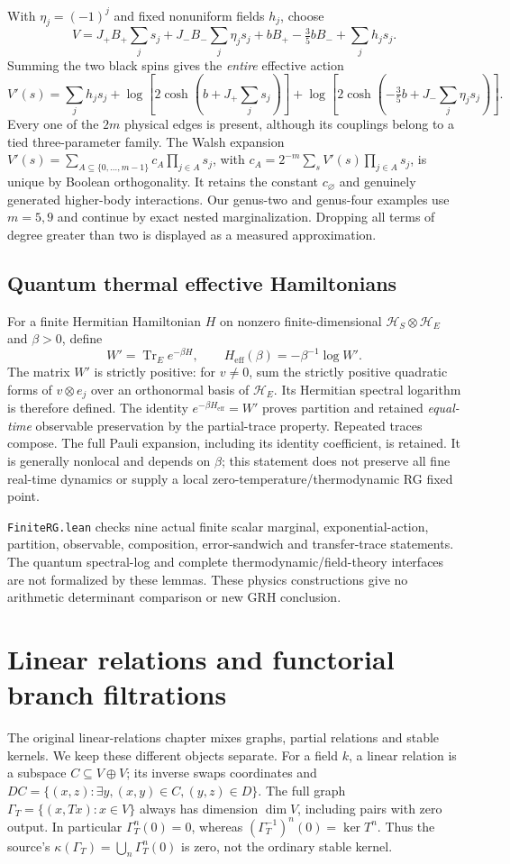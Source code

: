 \documentclass[11pt]{article}
\theoremstyle{definition}\newtheorem{definition}[theorem]{Definition}
\theoremstyle{remark}\newtheorem{remark}[theorem]{Remark}
\begin{document}
With $\eta_j=(-1)^j $ and fixed nonuniform fields $ h_j $, choose
\[
 V=J_+B_+\sum_js_j+J_-B_-\sum_j\eta_js_j
       +bB_+-\tfrac 35 bB_-+\sum_jh_js_j.
\]
Summing the two black spins gives the \emph{entire} effective action
\[
 V'(s)=\sum_jh_js_j+
 \log\!\left[2\cosh\!\left(b+J_+\sum_js_j\right)\right]+
 \log\!\left[2\cosh\!\left(-\tfrac 35 b+J_-\sum_j\eta_js_j\right)\right].
\]
Every one of the $2 m $ physical edges is present, although its couplings
belong to a tied three-parameter family. The Walsh expansion
$ V'(s)=\sum_{A\subseteq\{0,\ldots,m-1\}}c_A\prod_{j\in A}s_j $,
with $ c_A=2^{-m}\sum_sV'(s)\prod_{j\in A}s_j $, is unique by Boolean
orthogonality. It retains the constant $ c_\varnothing $ and genuinely
generated higher-body interactions. Our genus-two and genus-four examples
use $ m=5,9$ and continue by exact nested marginalization. Dropping all terms
of degree greater than two is displayed as a measured approximation.

\subsection{Quantum thermal effective Hamiltonians}
For a finite Hermitian Hamiltonian $ H $ on nonzero finite-dimensional
$\mathcal H_S\otimes\mathcal H_E $
and $\beta>0$, define
\[
 W'=\operatorname{Tr}_E e^{-\beta H},\qquad
 H_{\mathrm{eff}}(\beta)=-\beta^{-1}\log W'.
\]
The matrix $ W'$ is strictly positive: for $ v\ne 0$, sum the strictly
positive quadratic forms of $ v\otimes e_j $ over an orthonormal basis of
$\mathcal H_E $. Its Hermitian spectral logarithm is therefore defined.
The identity $ e^{-\beta H_{\mathrm{eff}}}=W'$ proves partition and retained
\emph{equal-time} observable preservation by the partial-trace property.
Repeated traces compose. The full Pauli expansion, including its identity
coefficient, is retained. It is generally nonlocal and depends on $\beta $;
this statement does not preserve all fine real-time dynamics or supply a
local zero-temperature/thermodynamic RG fixed point.

\texttt{FiniteRG.lean} checks nine actual finite scalar marginal,
exponential-action, partition, observable, composition, error-sandwich and
transfer-trace statements. The quantum spectral-log and complete
thermodynamic/field-theory interfaces are not formalized by these lemmas.
These physics constructions give no arithmetic determinant comparison or
new GRH conclusion.

\section{Linear relations and functorial branch filtrations}\label{rel:core}
The original linear-relations chapter mixes graphs, partial relations and
stable kernels. We keep these different objects separate. For a field $k$,
a linear relation is a subspace $C\subseteq V\oplus V$; its inverse swaps
coordinates and $DC=\{(x,z):\exists y,(x,y)\in C,(y,z)\in D\}$.
The full graph $\Gamma_T=\{(x,Tx):x\in V\}$ always has dimension
$\dim V$, including pairs with zero output. In particular
$\Gamma_T^n(0)=0$, whereas $(\Gamma_T^{-1})^n(0)=\ker T^n$.
Thus the source's $\kappa(\Gamma_T)=\bigcup_n\Gamma_T^n(0)$ is zero,
not the ordinary stable kernel.
\end{document}
